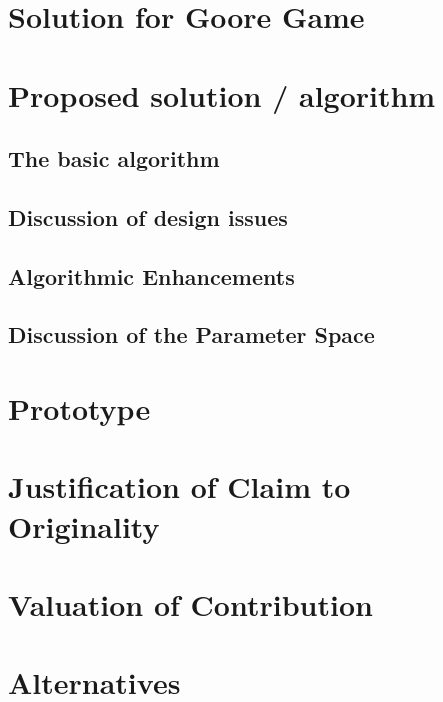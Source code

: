 \section{Solution for Goore Game}




\section{Proposed solution / algorithm}

\subsection{The basic algorithm}

\subsection{Discussion of design issues}


\subsection{Algorithmic Enhancements}


\subsection{Discussion of the Parameter Space}


\section{Prototype}

\section{Justification of Claim to Originality}

\section{Valuation of Contribution}

\section{Alternatives}
